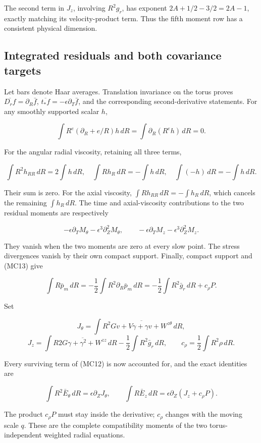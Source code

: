 \documentclass[10pt,a4paper]{article}
\begin{document}
The second term in \(J_z\), involving \(R^2g_r\), has exponent \(2A+1/2-3/2=2A-1\), exactly matching its velocity-product term. Thus the fifth moment row has a consistent physical dimension.

\subsection{Integrated residuals and both covariance targets}

Let bars denote Haar averages. Translation invariance on the torus proves \(\overline{D_rf}=\partial_R\bar f\), \(\overline{t_*f}=-\epsilon\partial_T\bar f\), and the corresponding second-derivative statements. For any smoothly supported scalar \(h\),

\[
\int R^e(\partial_R+e/R)h\,dR=\int\partial_R(R^eh)\,dR=0.
\]

For the angular radial viscosity, retaining all three terms,

\[
\int R^2h_{RR}\,dR=2\int h\,dR,\quad
\int Rh_R\,dR=-\int h\,dR,\quad
\int(-h)\,dR=-\int h\,dR.
\]

Their sum is zero. For the axial viscosity, \(\int Rh_{RR}\,dR=-\int h_R\,dR\), which cancels the remaining \(\int h_R\,dR\). The time and axial-viscosity contributions to the two residual moments are respectively

\[
-\epsilon\partial_TM_\theta-\epsilon^3\partial_Z^2M_\theta,
\qquad
-\epsilon\partial_TM_z-\epsilon^3\partial_Z^2M_z.
\]

They vanish when the two moments are zero at every slow point. The stress divergences vanish by their own compact support. Finally, compact support and (MC13) give

\[
\int R\bar p_m\,dR=-\frac12\int R^2\partial_R\bar p_m\,dR
=-\frac12\int R^2\bar g_r\,dR+c_\rho P.
\tag{MC16}
\]

Set

\[
J_\theta=\int R^2\overline{Gv+V\gamma+\gamma v+W^{z\theta}}\,dR,
\]
\[
J_z=\int R\overline{2G\gamma+\gamma^2+W^{zz}}\,dR
-\frac12\int R^2\bar g_r\,dR,
\qquad c_\rho=\frac12\int R^2\rho\,dR.
\]

Every surviving term of (MC12) is now accounted for, and the exact identities are

\[
\int R^2\bar E_\theta\,dR=\epsilon\partial_ZJ_\theta,
\qquad
\int R\bar E_z\,dR=\epsilon\partial_Z(J_z+c_\rho P).
\tag{MC17}
\]

The product \(c_\rho P\) must stay inside the derivative; \(c_\rho\) changes with the moving scale \(q\). These are the complete compatibility moments of the two torus-independent weighted radial equations.
\end{document}
